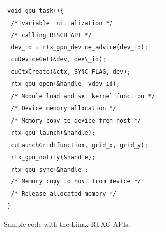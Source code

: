 \begin{figure}[!t]
\begin{center}
\begin{tabular}{l}
\hline\hline
{\scriptsize \verb|void gpu_task(){        |}\\
{\scriptsize \verb| /* variable initialization */ |}\\
{\scriptsize \verb| /* calling RESCH API */ |}\\
{\scriptsize \verb| dev_id = rtx_gpu_device_advice(dev_id); |}\\
{\scriptsize \verb| cuDeviceGet(&dev, dev\_id); |}\\
{\scriptsize \verb| cuCtxCreate(&ctx, SYNC_FLAG, dev); |}\\
{\scriptsize \verb| rtx_gpu_open(&handle, vdev_id); |}\\
{\scriptsize \verb| /* Module load and set kernel function */ |}\\
{\scriptsize \verb| /* Device memory allocation */ |}\\
{\scriptsize \verb| /* Memory copy to device from host */ |}\\
{\scriptsize \verb| rtx_gpu_launch(&handle); |}\\
{\scriptsize \verb| cuLaunchGrid(function, grid_x, grid_y); |}\\
{\scriptsize \verb| rtx_gpu_notify(&handle); |}\\
{\scriptsize \verb| rtx_gpu_sync(&handle); |}\\
{\scriptsize \verb| /* Memory copy to host from device */ |}\\
{\scriptsize \verb| /* Release allocated memory */ |}\\
{\scriptsize \verb|}|}\\
\hline\hline
\end{tabular}
\caption{Sample code with the Linux-RTXG APIs.}
\vspace{-2mm}
\label{fig:sample}
\end{center}
\end{figure}

